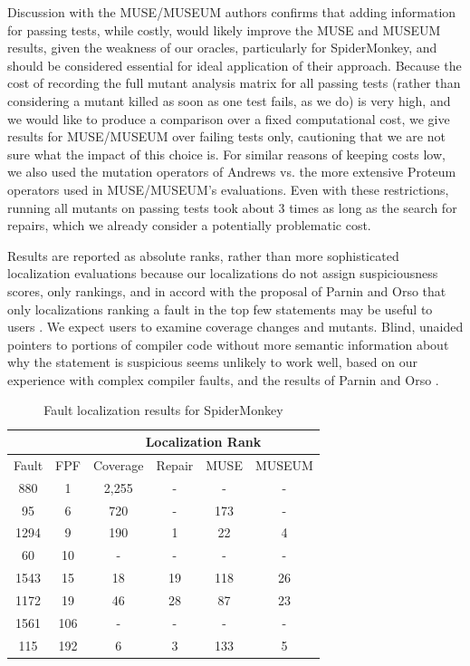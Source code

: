 Discussion with the MUSE/MUSEUM authors confirms  that adding information for passing tests, while costly, would likely improve the MUSE and MUSEUM results, given the weakness of our oracles, particularly for SpiderMonkey, and should be considered essential for ideal application of their approach.  Because the cost of recording the full mutant analysis matrix for all passing tests (rather than considering a mutant killed as soon as one test fails, as we do) is very high, and we would like to produce a comparison over a fixed computational cost, we give results for MUSE/MUSEUM over failing tests only, cautioning that we are not sure what the impact of this choice is.  For similar reasons of keeping costs low, we also used the mutation operators of Andrews vs. the more extensive Proteum \cite{Proteum} operators used in MUSE/MUSEUM's evaluations.  Even with these restrictions, running all mutants on passing tests took about 3 times as long as the search for repairs, which we already consider a potentially problematic cost.

Results are reported as absolute ranks, rather than more sophisticated \cite{MUSE} localization evaluations because our localizations do not assign suspiciousness scores, only rankings, and in accord with the proposal of Parnin and Orso that only localizations ranking a fault in the top few statements may be useful to users \cite{AutoHelp}.  We expect users to examine coverage changes and mutants.  Blind, unaided pointers to portions of compiler code without more semantic information about why the statement is suspicious seems unlikely to work well, based on our experience with complex compiler faults, and the results of Parnin and Orso \cite{AutoHelp}.

\begin{table}
\centering
{\scriptsize
\begin{tabular}{|c||c||c|c|c|c|}
\hline
& & \multicolumn{4}{|c|}{Localization Rank} \\
\hline
Fault & FPF & Coverage & Repair & MUSE & MUSEUM \\
\hline
880 & 1 & 2,255 & - & - & - \\
95 & 6 & 720 & - & 173 & -\\
1294 & 9 & 190 & 1 & 22 & 4 \\
60 & 10 & - & - & - & -\\
1543 & 15 & 18 & 19 & 118 & 26\\
1172 & 19 & 46 & 28 & 87 & 23\\
1561 & 106 & - & - & - & - \\
115 & 192 & 6 & 3 & 133 & 5 \\
\hline
\end{tabular}
}
\caption{Fault localization results for SpiderMonkey}
\label{jstable}
\end{table}


